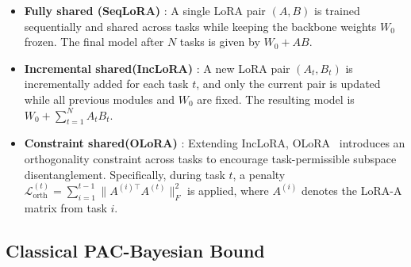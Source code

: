 \documentclass{article}
\theoremstyle{plain}
\theoremstyle{definition}
\theoremstyle{remark}
\begin{document}
\begin{itemize}
\vspace{-1em}
\item \textbf{Fully shared (SeqLoRA)} : A single LoRA pair $(A, B)$ is trained sequentially and shared across tasks while keeping the backbone weights $W_0$ frozen. The final model after $N$ tasks is given by $W_0 + AB$.
\vspace{-0.5em}
\item \textbf{Incremental shared(IncLoRA)} : A new LoRA pair $(A_t, B_t)$ is incrementally added for each task $t$, and only the current pair is updated while all previous modules and $W_0$ are fixed. The resulting model is $W_0 + \sum_{t=1}^N A_t B_t$.
\vspace{-0.25em}
\item \textbf{Constraint shared(OLoRA)} : Extending IncLoRA, OLoRA~\cite{wang2023orthogonal} introduces an orthogonality constraint across tasks to encourage task-permissible subspace disentanglement. Specifically, during task $t$, a penalty $\mathcal{L}_{\text{orth}}^{(t)} = \sum_{i=1}^{t-1} \|A^{(i)\top} A^{(t)}\|_F^2$ is applied, where $A^{(i)}$ denotes the LoRA-A matrix from task $i$.
\end{itemize}


\subsection{Classical PAC-Bayesian Bound}
\end{document}
